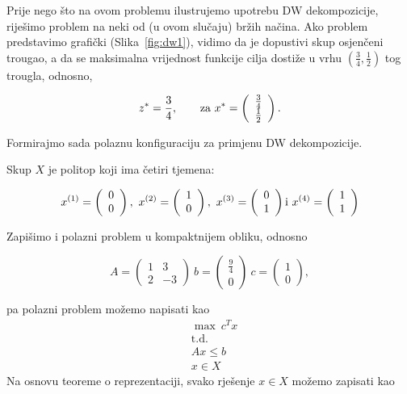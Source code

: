 \documentclass[b5paper, utf8, 11pt, colorlinks]{book}
\theoremstyle{definition}
\begin{document}
 Prije nego što na ovom problemu ilustrujemo upotrebu DW dekompozicije, riješimo problem na neki od (u ovom slučaju) bržih načina. Ako problem predstavimo grafički (Slika~\ref{fig:dw1}), vidimo da je dopustivi skup osjenčeni trougao, a da se maksimalna vrijednost funkcije cilja dostiže u vrhu $(\frac34, 
 \frac12)$ tog trougla, odnosno,

    \begin{equation}
 z^* = \frac 34,\qquad \textnormal{za}\ x^*=\left(\begin{array}{c}
 	\frac34\\
 	\frac12
 \end{array}\right).
 \end{equation}
 
 Formirajmo sada polaznu konfiguraciju za primjenu DW dekompozicije.
 
 Skup $X$ je politop koji ima četiri tjemena:
 
 $$   
 x^{(1)}=\left(\begin{array}{c}
 		0\\
 		0
 	\end{array}\right),\  x^{(2)}=\left(\begin{array}{c}
 	1\\
 	0
 \end{array}\right),\  x^{(3)}=\left(\begin{array}{c}
 0\\
 1
\end{array}\right) \textnormal{i}\ x^{(4)}=\left(\begin{array}{c}
1\\
1
\end{array}\right)
$$
 
 Zapišimo i polazni problem u kompaktnijem obliku, odnosno
 
 $$
 A = \left(\begin{array}{cc}
 	1 & 3 \\
 	2 & -3
 \end{array}\right) \ b=\left(\begin{array}{c}
 \frac 9 4\\
 0
\end{array}\right)\ c=\left(\begin{array}{c}
1\\
0
\end{array}\right),
 $$
 
 pa polazni problem možemo napisati kao
    \begin{equation}
 	\begin{aligned}\label{primjer:dw2}
 		&\max\ c^Tx\\
 		&\mbox{t.d.}\\
 		  &Ax\leqslant b\\
 		&x \in X
 	\end{aligned}
 \end{equation}
Na osnovu teoreme o reprezentaciji, svako rješenje $x \in X$ možemo zapisati kao
\end{document}
